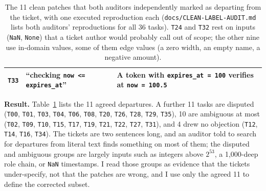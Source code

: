 \documentclass[11pt]{article}
\begin{document}
\begin{table}[h]
\begin{tabularx}{\textwidth}{@{}l >{\raggedright\arraybackslash}X >{\raggedright\arraybackslash}X@{}}
\texttt{T33} & ``checking \texttt{now <= expires\_at}'' & A token with \texttt{expires\_at = 100} verifies at \texttt{now = 100.5} \\
\bottomrule
\end{tabularx}
\caption{The 11 clean patches that both auditors independently marked as departing from the ticket, with one executed reproduction each (\texttt{docs/CLEAN-LABEL-AUDIT.md} lists both auditors' reproductions for all 36 tasks). \texttt{T24} and \texttt{T32} rest on inputs (\texttt{NaN}, \texttt{None}) that a ticket author would probably call out of scope; the other nine use in-domain values, some of them edge values (a zero width, an empty name, a negative amount).}
\label{tab:audit}
\end{table}

\textbf{Result.} Table~\ref{tab:audit} lists the 11 agreed departures. A further 11 tasks are disputed (\texttt{T00}, \texttt{T01}, \texttt{T03}, \texttt{T04}, \texttt{T06}, \texttt{T08}, \texttt{T20}, \texttt{T26}, \texttt{T28}, \texttt{T29}, \texttt{T35}), 10 are ambiguous at most (\texttt{T02}, \texttt{T09}, \texttt{T10}, \texttt{T15}, \texttt{T17}, \texttt{T19}, \texttt{T21}, \texttt{T22}, \texttt{T27}, \texttt{T31}), and 4 drew no objection (\texttt{T12}, \texttt{T14}, \texttt{T16}, \texttt{T34}). The tickets are two sentences long, and an auditor told to search for departures from literal text finds something on most of them; the disputed and ambiguous groups are largely inputs such as integers above \(2^{53}\), a 1,000-deep role chain, or \texttt{NaN} timestamps. I read those groups as evidence that the tickets under-specify, not that the patches are wrong, and I use only the agreed 11 to define the corrected subset.
\end{document}
